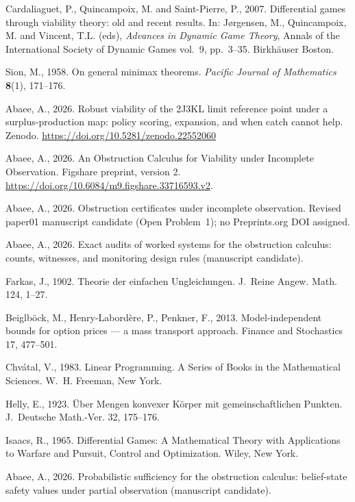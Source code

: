 \documentclass[10pt,twocolumn]{article}
\theoremstyle{definition}
\begin{document}
Cardaliaguet, P., Quincampoix, M. and Saint-Pierre, P., 2007. Differential games through
viability theory: old and recent results. In: J\o rgensen, M., Quincampoix, M. and Vincent,
T.L. (eds), \emph{Advances in Dynamic Game Theory}, Annals of the International Society of
Dynamic Games vol.\ 9, pp.\ 3--35. Birkh\"auser Boston.

Sion, M., 1958. On general minimax theorems. \emph{Pacific Journal of Mathematics}
\textbf{8}(1), 171--176.


Abaee, A., 2026. Robust viability of the 2J3KL limit reference point
under a surplus-production map: policy scoring, expansion, and when catch
cannot help. Zenodo. \url{https://doi.org/10.5281/zenodo.22552060}

Abaee, A., 2026. An Obstruction Calculus for Viability under Incomplete Observation. Figshare preprint, version 2. \url{https://doi.org/10.6084/m9.figshare.33716593.v2}.

Abaee, A., 2026. Obstruction certificates under incomplete observation. Revised paper01 manuscript candidate (Open Problem~1); no Preprints.org DOI assigned.

Abaee, A., 2026. Exact audits of worked systems for the obstruction calculus:
counts, witnesses, and monitoring design rules (manuscript candidate).

Farkas, J., 1902. Theorie der einfachen Ungleichungen. J.\ Reine Angew.
Math. 124, 1--27.


Beiglb\"ock, M., Henry-Labord\`ere, P., Penkner, F., 2013.
Model-independent bounds for option prices --- a mass transport approach.
Finance and Stochastics 17, 477--501.

Chv\'{a}tal, V., 1983. Linear Programming. A Series of Books in the
Mathematical Sciences. W.~H. Freeman, New York.

Helly, E., 1923. \"Uber Mengen konvexer K\"orper mit gemeinschaftlichen
Punkten. J.~Deutsche Math.-Ver. 32, 175--176.

Isaacs, R., 1965. Differential Games: A Mathematical Theory with
Applications to Warfare and Pursuit, Control and Optimization. Wiley,
New York.

Abaee, A., 2026. Probabilistic sufficiency for the obstruction calculus:
belief-state safety values under partial observation (manuscript candidate).
\end{document}
